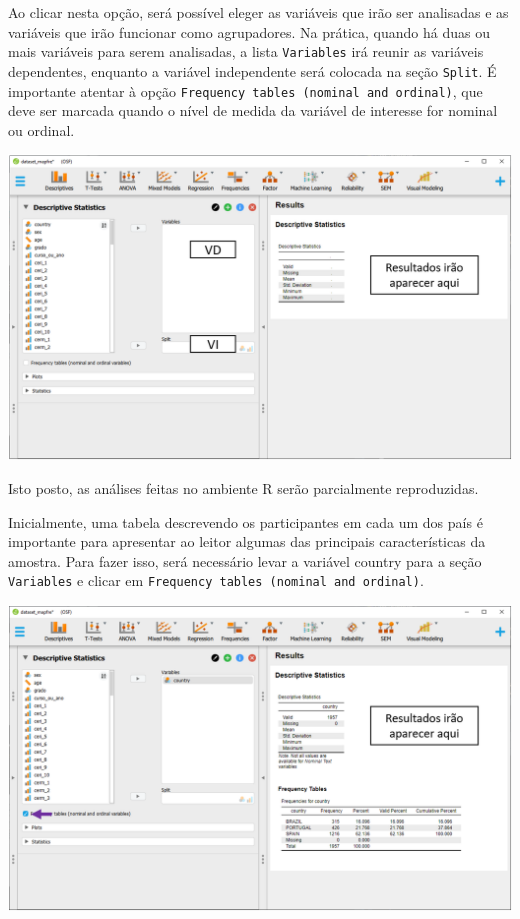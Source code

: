 \documentclass[
]{book}
\begin{document}
Ao clicar nesta opção, será possível eleger as variáveis que irão ser
analisadas e as variáveis que irão funcionar como agrupadores. Na
prática, quando há duas ou mais variáveis para serem analisadas, a lista
\texttt{Variables} irá reunir as variáveis dependentes, enquanto a
variável independente será colocada na seção \texttt{Split}. É
importante atentar à opção
\texttt{Frequency\ tables\ (nominal\ and\ ordinal)}, que deve ser
marcada quando o nível de medida da variável de interesse for nominal ou
ordinal.

\includegraphics{./img/cap_desc_jasp_descritivo2.png}

Isto posto, as análises feitas no ambiente R serão parcialmente
reproduzidas.

Inicialmente, uma tabela descrevendo os participantes em cada um dos
país é importante para apresentar ao leitor algumas das principais
características da amostra. Para fazer isso, será necessário levar a
variável country para a seção \texttt{Variables} e clicar em
\texttt{Frequency\ tables\ (nominal\ and\ ordinal)}.

\includegraphics{./img/cap_desc_jasp_proporcao.png}
\end{document}
